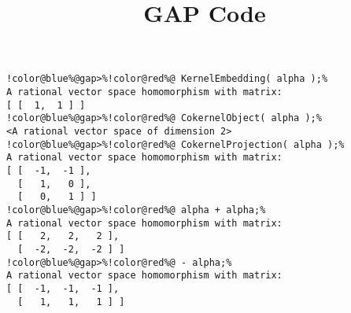 \documentclass[12pt]{amsart}
\title{GAP Code}
\author{}
\begin{document}
\maketitle

\begin{Verbatim}[commandchars=!@\%,frame=single]
!color@blue%@gap>%!color@red%@ KernelEmbedding( alpha );%
A rational vector space homomorphism with matrix:
[ [  1,  1 ] ]
!color@blue%@gap>%!color@red%@ CokernelObject( alpha );%
<A rational vector space of dimension 2>
!color@blue%@gap>%!color@red%@ CokernelProjection( alpha );%
A rational vector space homomorphism with matrix: 
[ [  -1,  -1 ],
  [   1,   0 ],
  [   0,   1 ] ]
!color@blue%@gap>%!color@red%@ alpha + alpha;%
A rational vector space homomorphism with matrix: 
[ [   2,   2,   2 ],
  [  -2,  -2,  -2 ] ]
!color@blue%@gap>%!color@red%@ - alpha;%
A rational vector space homomorphism with matrix: 
[ [  -1,  -1,  -1 ],
  [   1,   1,   1 ] ]
\end{Verbatim}
\end{document}

